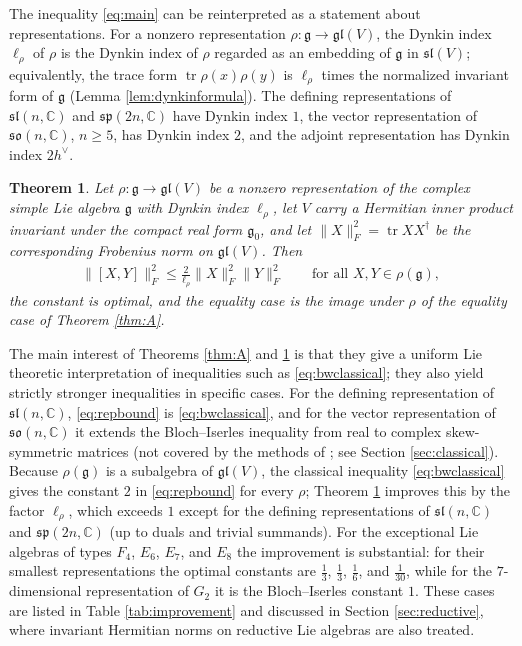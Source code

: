 \documentclass[leqno,10pt]{amsart}
\newtheorem{theorem}{Theorem}[section]
\theoremstyle{definition}
\numberwithin{equation}{section}
\newcommand{\so}{\mathfrak{so}}
\renewcommand{\sp}{\mathfrak{sp}}
\newcommand{\gl}{\mathfrak{gl}}
\newcommand{\sll}{\mathfrak{sl}}
\newcommand{\g}{\mathfrak{g}}
\newcommand{\com}{\mathbb C}
\newcommand{\tr}{\operatorname{tr}}
\newcommand{\gz}{\g_{0}}
\newcommand{\hv}{h^\vee}
\newcommand{\fnorm}[1]{\lVert #1\rVert_{F}}
\begin{document}
The inequality \eqref{eq:main} can be reinterpreted as a statement about representations. For a nonzero representation $\rho:\g \to \gl(V)$, the Dynkin index $\ell_{\rho}$ of $\rho$ is the Dynkin index of $\rho$ regarded as an embedding of $\g$ in $\sll(V)$; equivalently, the trace form $\tr \rho(x)\rho(y)$ is $\ell_{\rho}$ times the normalized invariant form of $\g$ (Lemma \ref{lem:dynkinformula}). The defining representations of $\sll(n, \com)$ and $\sp(2n, \com)$ have Dynkin index $1$, the vector representation of $\so(n, \com)$, $n \geq 5$, has Dynkin index $2$, and the adjoint representation has Dynkin index $2\hv$.

\begin{theorem}\label{thm:B}
Let $\rho:\g \to \gl(V)$ be a nonzero representation of the complex simple Lie algebra $\g$ with Dynkin index $\ell_{\rho}$, let $V$ carry a Hermitian inner product invariant under the compact real form $\gz$, and let $\fnorm{X}^{2} = \tr XX^{\dagger}$ be the corresponding Frobenius norm on $\gl(V)$. Then
\begin{align}\label{eq:repbound}
\fnorm{[X, Y]}^{2} \leq \frac{2}{\ell_{\rho}}\fnorm{X}^{2}\fnorm{Y}^{2} \qquad \text{for all}\,\, X, Y \in \rho(\g),
\end{align}
the constant is optimal, and the equality case is the image under $\rho$ of the equality case of Theorem \ref{thm:A}.
\end{theorem}

The main interest of Theorems \ref{thm:A} and \ref{thm:B} is that they give a uniform Lie theoretic interpretation of inequalities such as \eqref{eq:bwclassical}; they also yield strictly stronger inequalities in specific cases.
For the defining representation of $\sll(n, \com)$, \eqref{eq:repbound} is \eqref{eq:bwclassical}, and for the vector representation of $\so(n, \com)$ it extends the Bloch--Iserles inequality from real to complex skew-symmetric matrices (not covered by the methods of \cite{Ge-Li-Zhou}; see Section \ref{sec:classical}). Because $\rho(\g)$ is a subalgebra of $\gl(V)$, the classical inequality \eqref{eq:bwclassical} gives the constant $2$ in \eqref{eq:repbound} for every $\rho$; Theorem \ref{thm:B} improves this by the factor $\ell_{\rho}$, which exceeds $1$ except for the defining representations of $\sll(n, \com)$ and $\sp(2n, \com)$ (up to duals and trivial summands). For the exceptional Lie algebras of types $F_{4}$, $E_{6}$, $E_{7}$, and $E_{8}$ the improvement is substantial: for their smallest representations the optimal constants are $\tfrac{1}{3}$, $\tfrac{1}{3}$, $\tfrac{1}{6}$, and $\tfrac{1}{30}$, while for the $7$-dimensional representation of $G_{2}$ it is the Bloch--Iserles constant $1$. These cases are listed in Table \ref{tab:improvement} and discussed in Section \ref{sec:reductive}, where invariant Hermitian norms on reductive Lie algebras are also treated.
\end{document}
